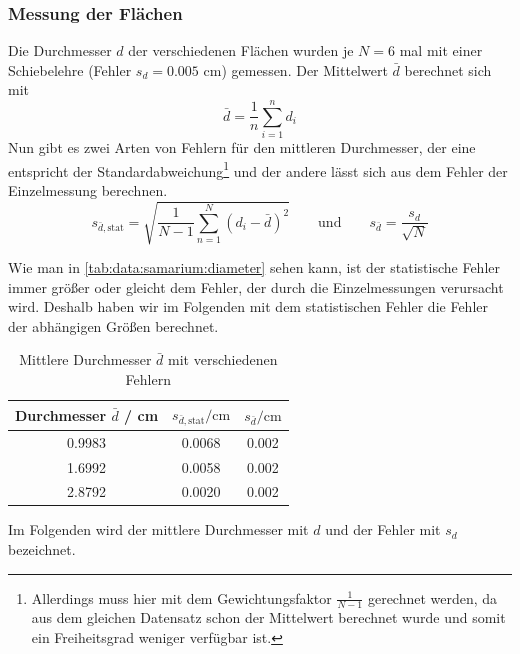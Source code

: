 \subsubsection{Messung der Flächen}
Die Durchmesser $d$ der verschiedenen Flächen wurden je $N = 6$ mal mit einer Schiebelehre (Fehler $s_d = 0.005$ cm) gemessen. Der Mittelwert $\bar{d}$ berechnet sich mit
\begin{equation}
  \bar{d} = \frac{1}{n} \sum_{i=1}^{n} d_i
\end{equation}
Nun gibt es zwei Arten von Fehlern für den mittleren Durchmesser, der eine entspricht der Standardabweichung\footnote{Allerdings muss hier mit 
dem Gewichtungsfaktor $\frac{1}{N-1}$ gerechnet werden, da aus dem gleichen Datensatz schon der Mittelwert berechnet wurde und somit ein Freiheitsgrad 
weniger verfügbar ist.} 
und der andere lässt sich aus dem Fehler der Einzelmessung berechnen.
\begin{equation}
  s_{\bar{d}, \text{stat}} = \sqrt{\frac{1}{N-1} \sum_{n=1}^{N} \left( d_i - \bar{d} \right)^2} \qquad \text{und} \qquad 
  s_{\bar{d}} = \frac{s_d}{\sqrt{N}} 
\end{equation}

Wie man in \autoref{tab:data:samarium:diameter} sehen kann, ist der statistische Fehler immer größer oder gleicht dem Fehler, der durch die Einzelmessungen 
verursacht wird. Deshalb haben wir im Folgenden mit dem statistischen Fehler die Fehler der abhängigen Größen berechnet.
\begin{table}[H]
\caption{Mittlere Durchmesser $\bar{d}$ mit verschiedenen Fehlern}
\begin{center}
\begin{tabular}{|c|c|c|}
  \hline
  \rule{0pt}{1em} Durchmesser $\bar{d}$ / cm & $s_{\bar{d}, \text{stat}} / \text{cm}$ & $s_{\bar{d}} / \text{cm}$  \\ \hline %
  0.9983 & 0.0068 & 0.002 \\ \hline
  1.6992 & 0.0058 & 0.002 \\ \hline
  2.8792 & 0.0020 & 0.002 \\ \hline
\end{tabular}
\end{center}
\label{tab:data:samarium:diameter}
\end{table}
Im Folgenden wird der mittlere Durchmesser mit $d$ und der Fehler mit $s_d$ bezeichnet.
